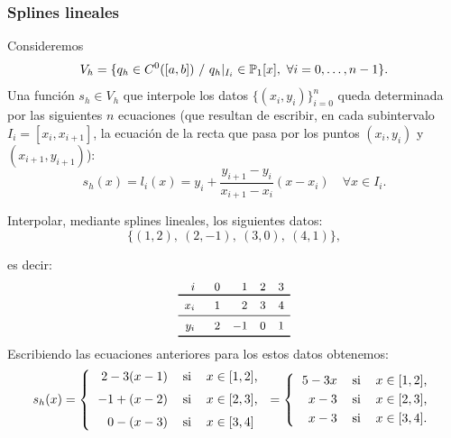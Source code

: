  \subsubsection{Splines lineales}
 \label{sec:splines-lineales}

 Consideremos
 \begin{equation*}
   V_h = \{q_h \in C^{0}([a,b])\ / \ q_h|_{I_i}\in  \operatorname{{\mathbb P}}_1[x],\ \forall i=0,\dots,n-1\}.
 \end{equation*}
 Una función $s_h\in V_h$ que interpole los datos
 $\{(x_i,y_i)\}_{i=0}^n$ queda determinada por las siguientes $n$
 ecuaciones (que resultan de escribir, en cada subintervalo $I_i=[x_i,
 x_{i+1}]$, la ecuación de la recta que pasa por los puntos
 $(x_i,y_i)$ y $(x_{i+1},y_{i+1})$):
 \begin{equation*}
   \label{eq:splines-lineales-1}
   s_h(x) = l_i(x) = y_i + \frac{y_{i+1}-y_i}{x_{i+1}-x_i}(x-x_i) \quad
   \forall x\in I_i.
 \end{equation*}

 \begin{example}
   \label{ex:splines-lineales-1}
   Interpolar, mediante splines lineales, los siguientes
   datos:
   \begin{equation*}
     \{ (1,2),\ (2,-1),\ (3,0),\ (4,1) \},
   \end{equation*}
 \end{example}
 es decir:
 \begin{equation}
   \small
   \begin{array}{r@{\rule{4ex}{0pt}}rrrcr}
     i & 0 & 1 & 2 & 3 
     \\ \toprule %
     x_i & 1 & 2 & 3 & 4
     \\ \midrule
     y_i & 2 & -1 & 0  & 1
     \\
     \bottomrule
   \end{array}
   \label{eq:tabla-datos-lagrange-splines}
 \end{equation}
 Escribiendo las ecuaciones anteriores para los
 estos datos obtenemos:
 \begin{equation*}
   s_h(x)=\left\{
     \begin{tabular}{rll}
       $2 -3 (x-1)$ & si & $x\in[1,2]$,
       \\\noalign{\medskip}
       $-1 + (x-2)$ & si & $x\in[2,3]$,
       \\\noalign{\medskip}
       $0 - (x-3)$ & si & $x\in[3,4]$
     \end{tabular} \right.
   =\left\{
     \begin{tabular}{rll}
       $5 -3x$ & si & $x\in[1,2]$,
       \\\noalign{\smallskip}
       $x-3$ & si & $x\in[2,3]$,
       \\\noalign{\smallskip}
       $x-3$ & si & $x\in[3,4]$.
     \end{tabular} \right.
 \end{equation*}


